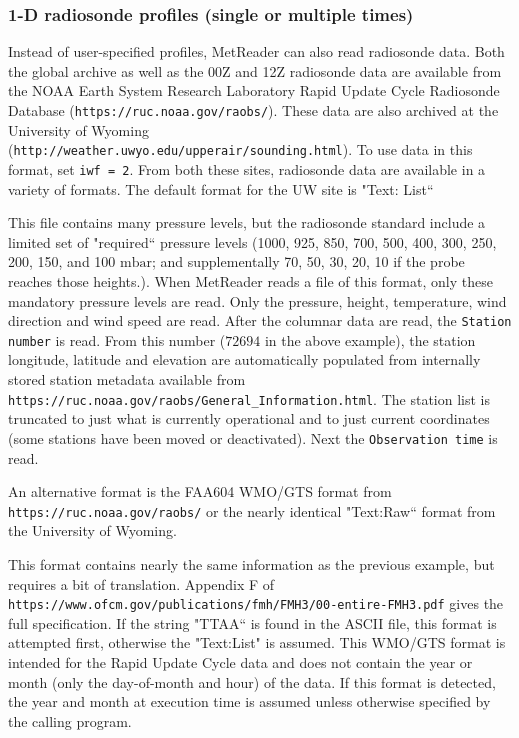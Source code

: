 \documentclass[11pt]{article}   %
\begin{document}
\subsubsection{1-D radiosonde profiles (single or multiple times)}
Instead of user-specified profiles, MetReader can also read radiosonde data.
Both the global archive as well as the 00Z and 12Z radiosonde data are
available from the NOAA Earth System Research Laboratory Rapid Update Cycle
Radiosonde Database (\texttt{https://ruc.noaa.gov/raobs/}).  These data
are also archived at the University of Wyoming\\
(\texttt{http://weather.uwyo.edu/upperair/sounding.html}).
To use data in this format, set \texttt{iwf = 2}.
From both these sites, radiosonde data are available in a variety of formats.
The default format for the UW site is "Text: List``

\small  \normalsize

This file contains many pressure levels, but the radiosonde standard include
a limited set of "required`` pressure levels (1000, 925, 850, 700, 500,
400, 300, 250, 200, 150, and 100 $\mathrm{mbar}$; and supplementally 
70, 50, 30, 20, 10 if the probe reaches those heights.).
When MetReader reads a file of this format, only these mandatory pressure levels are
read.  Only the pressure, height, temperature, wind direction and wind speed are read.
After the columnar data are read, the \texttt{Station number} is read.  From this number
($72694$ in the above example), the station longitude, latitude and elevation are
automatically populated from internally stored station
metadata available from \texttt{https://ruc.noaa.gov/raobs/General\_Information.html}.  The
station list is truncated to just what is currently operational and to just current
coordinates (some stations have been moved or deactivated).
Next the \texttt{Observation time} is read.  

An alternative format is the FAA604 WMO/GTS format from \texttt{https://ruc.noaa.gov/raobs/}
or the nearly identical "Text:Raw`` format from the University of Wyoming.

\small  \normalsize

This format contains nearly the same information as the previous example, but 
requires a bit of translation.
Appendix F of\\
\texttt{https://www.ofcm.gov/publications/fmh/FMH3/00-entire-FMH3.pdf}
gives the full specification.
If the string "TTAA`` is found
in the ASCII file, this format is attempted first, otherwise the "Text:List" is
assumed.  This WMO/GTS format is intended for the Rapid Update Cycle data and
does not contain the year or month (only the day-of-month and hour) of the data.
If this format is detected, the year and month at
execution time is assumed unless otherwise
specified by the calling program.
\end{document}
